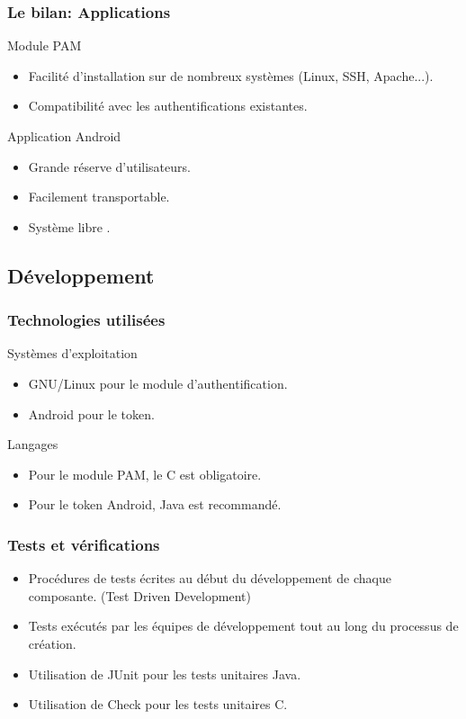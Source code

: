 \documentclass[xcolor=table]{beamer}
\begin{document}
\begin{frame}
\frametitle{Le bilan: Applications}
\begin{block}{Module PAM}
\begin{itemize}
\item Facilité d'installation sur de nombreux systèmes (Linux, SSH, Apache...).
\item Compatibilité avec les authentifications existantes.
\end{itemize}
\end{block}

\begin{block}{Application Android}
\begin{itemize}
\item Grande réserve d'utilisateurs.
\item Facilement transportable.
\item Système \og libre \fg{}. 
\end{itemize}
\end{block} 
\end{frame}


\subsection{Développement}

\begin{frame}
\frametitle{Technologies utilisées}
\begin{block}{Systèmes d'exploitation}
\begin{itemize}
\item GNU/Linux pour le module d'authentification.
\item Android pour le token.
\end{itemize}

\end{block}
\begin{block}{Langages}
\begin{itemize}
  \item Pour le module PAM, le C est obligatoire.
  \item Pour le token Android, Java est recommandé. 
\end{itemize}
\end{block}
\end{frame}

\begin{frame}
  \frametitle{Tests et vérifications}
  \begin{itemize}
   \item Procédures de tests écrites au début du développement de chaque composante. (Test Driven Development)
   \item Tests exécutés par les équipes de développement tout au long du processus de création.
   \item Utilisation de JUnit pour les tests unitaires Java.
   \item Utilisation de Check pour les tests unitaires C.
  \end{itemize}
\end{frame}
\end{document}
